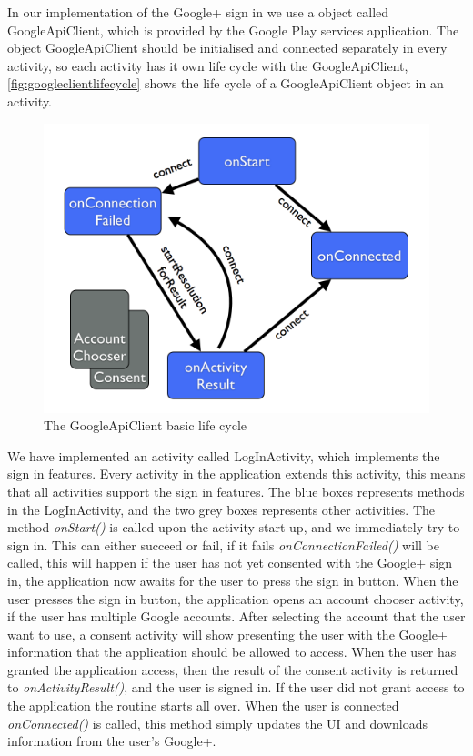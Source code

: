 In our implementation of the Google+ sign in we use a object called \\GoogleApiClient\citep{googleapiclient-docs}, which is provided by the Google Play services application. 
The object GoogleApiClient should be initialised and connected separately in every activity, so each activity has it own life cycle with the GoogleApiClient, \autoref{fig:googleclientlifecycle} shows the life cycle of a GoogleApiClient object in an activity.
\begin{figure}[H]
\centering
\includegraphics[width=0.75\linewidth]{img/googleclientflow.png}
\caption{The GoogleApiClient basic life cycle\cite{googleapiclient-lifecycle}}
\label{fig:googleclientlifecycle}
\end{figure}
We have implemented an activity called LogInActivity, which implements the sign in features. Every activity in the application extends this activity, this means that all activities support the sign in features. 
The blue boxes represents methods in the LogInActivity, and the two grey boxes represents other activities. The method \textit{onStart()} is called upon the activity start up, and we immediately try to sign in. 
This can either succeed or fail, if it fails \textit{onConnectionFailed()} will be called, this will happen if the user has not yet consented with the Google+ sign in, the application now awaits for the user to press the sign in button. 
When the user presses the sign in button, the application opens an account chooser activity, if the user has multiple Google accounts. 
After selecting the account that the user want to use, a consent activity will show presenting the user with the Google+ information that the application should be allowed to access. 
When the user has granted the application access, then the result of the consent activity is returned to \textit{onActivityResult()}, and the user is signed in. 
If the user did not grant access to the application the routine starts all over. When the user is connected \textit{onConnected()} is called, this method simply updates the UI and downloads information from the user's Google+. 

